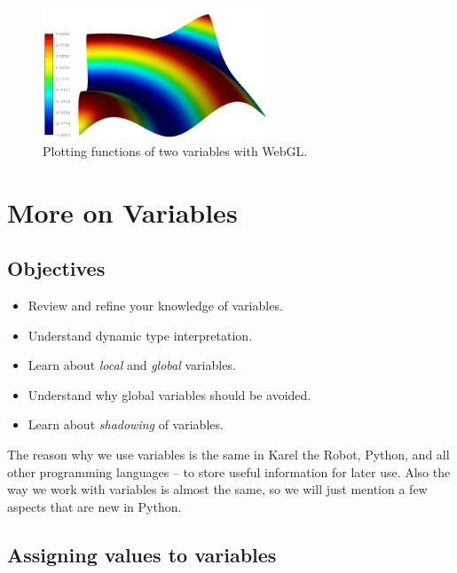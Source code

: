 \begin{figure}[!ht]
\begin{center}
\includegraphics[width=0.6\textwidth]{imgp/webgl.png}
\end{center}
\vspace{-2mm}
\caption{Plotting functions of two variables with WebGL.}
\label{fig:webgl}
\end{figure}


\section{More on Variables}

\subsection{Objectives}

\begin{itemize}
\item Review and refine your knowledge of variables.
\item Understand dynamic type interpretation.
\item Learn about {\em local} and {\em global} variables.
\item Understand why global variables should be avoided.
\item Learn about {\em shadowing} of variables.
\end{itemize}
The reason why we use variables is the same in Karel the Robot, Python, and all other programming 
languages -- to store useful information for later use. Also the way we work with variables is almost the 
same, so we will just mention a few aspects that are new in Python.

\subsection{Assigning values to variables}

